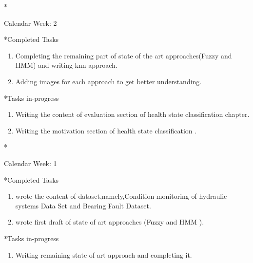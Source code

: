 \documentclass[11pt,a4paper]{article}
\begin{document}
\newpage
\begin{section}*{Calendar Week: 2 \hfill \date{15 January, 2021}}
 

       \begin{subsection}*{Completed Tasks}
             \begin{enumerate}
                 \item Completing the remaining part of state of the art approaches(Fuzzy and HMM) and writing knn approach.
                 \item Adding images for each approach to get better understanding.
             \end{enumerate}
                 
       \end{subsection}

       \begin{subsection}*{Tasks in-progress}
             \begin{enumerate}
                   \item  Writing the content of evaluation section of health state classification chapter.
                   \item Writing the motivation section of health state classification .

             \end{enumerate}
       \end{subsection}


\end{section}

\newpage
\begin{section}*{Calendar Week: 1 \hfill \date{8 January, 2021}}
 \begin{refsection}

       \begin{subsection}*{Completed Tasks}
             \begin{enumerate}
                 \item wrote the content of dataset,namely,Condition monitoring of hydraulic systems Data Set \cite{DBLP:conf/i2mtc/HelwigPS15}and Bearing Fault Dataset.
                 \item wrote first draft of state of art approaches (Fuzzy and HMM ).
             \end{enumerate}
                 
       \end{subsection}

       \begin{subsection}*{Tasks in-progress}
             \begin{enumerate}
                   \item  Writing remaining state of art approach and completing it.

             \end{enumerate}
       \end{subsection}

       \printbibliography
 \end{refsection}
\end{section}
\end{document}
